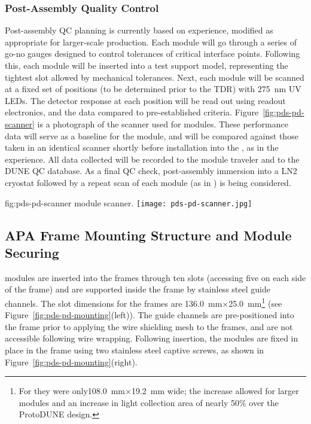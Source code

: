 \subsubsection{Post-Assembly Quality Control}

Post-assembly QC planning is currently based on  experience, modified as appropriate for larger-scale production.  Each module will go through a series of go-no gauges designed to control tolerances of critical interface points.  Following this, each module will be inserted into a test  support model, representing the tightest slot allowed by  mechanical tolerances. Next, each module will be scanned at a fixed set of positions (to be determined prior to the TDR) with \SI{275}{nm} UV LEDs.  The detector response at each position will be read out using  readout electronics, and the data compared to pre-established criteria.  Figure~\ref{fig:pds-pd-scanner} is a photograph of the scanner used for  modules. These performance data will serve as a baseline for the module, and will be compared against those taken in an identical scanner shortly before installation into the , as in the  experience.  All data collected will be recorded to the module traveler and to the DUNE QC database.
As a final QC check, post-assembly immersion into a LN2 cryostat followed by a repeat scan of each  module (as in ) is being considered.

\begin{dunefigure}{fig:pds-pd-scanner}
{ module scanner.}
  \texttt{[image: pds-pd-scanner.jpg]}
\end{dunefigure}


\subsection{APA Frame Mounting Structure and Module Securing}	
\label{sec:fdsp-pd-assy-frames}

 modules are inserted into the  frames through ten slots 
(accessing five on each side of the  frame) and are supported inside the frame by 
stainless steel guide channels.  The slot dimensions for the   frames 
are \SI{136.0}{mm}$\times$\SI{25.0}{mm}\footnote{For  they were only\SI{108.0}{mm}$\times$\SI{19.2}{mm} wide; the increase allowed for larger  modules and an increase in light collection area of nearly 50\% over the ProtoDUNE design.}   
(see Figure~\ref{fig:pds-pd-mounting}(left)).
The guide channels are pre-positioned into the  frame prior to applying the wire shielding mesh to the  frames, and are not accessible following wire wrapping. Following insertion, the  modules are fixed in place in the  frame using two stainless steel captive screws, as shown in Figure~\ref{fig:pds-pd-mounting}(right).
 
